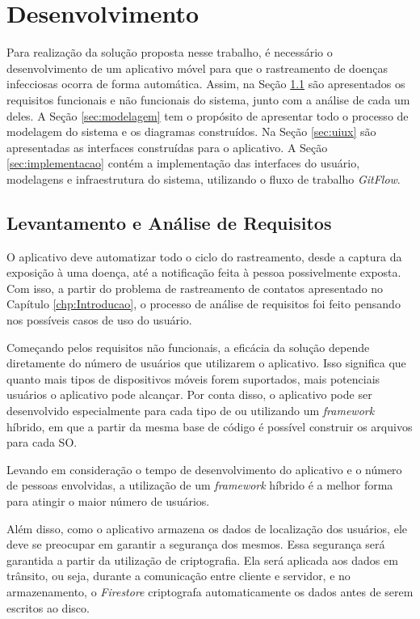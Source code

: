 \chapter{Desenvolvimento}\label{chp:desenvolvimento}

Para realização da solução proposta nesse trabalho, é necessário o desenvolvimento de um aplicativo móvel para que o rastreamento de doenças infecciosas ocorra de forma automática. Assim, na Seção \ref{sec:requisitos} são apresentados os requisitos funcionais e não funcionais do sistema, junto com a análise de cada um deles. A Seção \ref{sec:modelagem} tem o propósito de apresentar todo o processo de modelagem do sistema e os diagramas construídos. Na Seção \ref{sec:uiux} são apresentadas as interfaces construídas para o aplicativo. A Seção \ref{sec:implementacao} contém a implementação das interfaces do usuário, modelagens e infraestrutura do sistema, utilizando o fluxo de trabalho \textit{GitFlow}.

\section{Levantamento e Análise de Requisitos}\label{sec:requisitos}
O aplicativo deve automatizar todo o ciclo do rastreamento, desde a captura da exposição à uma doença, até a notificação feita à pessoa possivelmente exposta. Com isso, a partir do problema de rastreamento de contatos apresentado no Capítulo \ref{chp:Introducao}, o processo de análise de requisitos foi feito pensando nos possíveis casos de uso do usuário.

Começando pelos requisitos não funcionais, a eficácia da solução depende diretamente do número de usuários que utilizarem o aplicativo. Isso significa que quanto mais tipos de dispositivos móveis forem suportados, mais potenciais usuários o aplicativo pode alcançar. Por conta disso, o aplicativo pode ser desenvolvido especialmente para cada tipo de  ou utilizando um \textit{framework} híbrido, em que a partir da mesma base de código é possível construir os arquivos para cada SO.

Levando em consideração o tempo de desenvolvimento do aplicativo e o número de pessoas envolvidas, a utilização de um \textit{framework} híbrido é a melhor forma para atingir o maior número de usuários.

Além disso, como o aplicativo armazena os dados de localização dos usuários, ele deve se preocupar em garantir a segurança dos mesmos. Essa segurança será garantida a partir da utilização de criptografia. Ela será aplicada aos dados em trânsito, ou seja, durante a comunicação entre cliente e servidor, e no armazenamento, o \textit{Firestore} criptografa automaticamente os dados antes de serem escritos ao disco.

